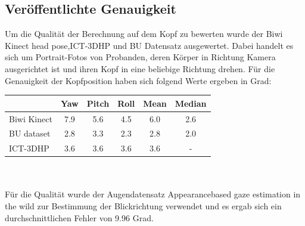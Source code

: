 \subsection{Veröffentlichte Genauigkeit}
Um die Qualität der Berechnung auf dem Kopf zu bewerten wurde der \glqq Biwi Kinect head pose\grqq \cite{BIWI_database},\glqq ICT-3DHP\grqq \cite{ICT_database} und \glqq BU Datensatz\grqq \cite{BU_database} ausgewertet. Dabei handelt es sich um Portrait-Fotos von Probanden, deren Körper in Richtung Kamera ausgerichtet ist und ihren Kopf in eine beliebige Richtung drehen. Für die Genauigkeit der Kopfposition haben sich folgend Werte ergeben in Grad:\\
\begin{tabular}{|l|c|c|c||c|c|}
	\hline
	&Yaw&Pitch&Roll&Mean&Median\\\hline
	Biwi Kinect&7.9&5.6&4.5&6.0&2.6\\\hline
	BU dataset&2.8&3.3&2.3&2.8&2.0\\\hline
	ICT-3DHP&3.6&3.6&3.6&3.6&-\\\hline
\end{tabular}\\\\
Für die Qualität wurde der Augendatensatz \glqq Appearancebased
gaze estimation in the wild\grqq \cite{database_Eye_old} zur Bestimmung der Blickrichtung verwendet und es ergab sich ein durchschnittlichen Fehler von 9.96 Grad.
